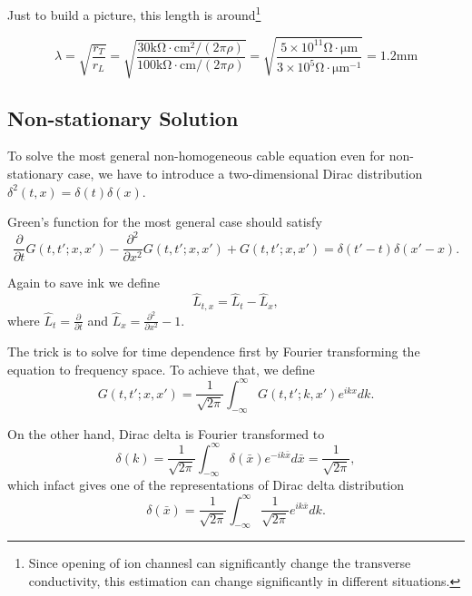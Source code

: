 \documentclass{tufte-handout}
\begin{document}
Just to build a picture, this length is around\footnote{Since opening of ion channesl can significantly change the transverse conductivity, this estimation can change significantly in different situations.}

\begin{equation*}
    \lambda = \sqrt{ \frac{r_T}{r_L}} = \sqrt{ \frac{30\mathrm{k\Omega\cdot cm^2}/(2\pi \rho)}{ 100 \mathrm{k\Omega\cdot cm}/(2\pi \rho) } } = \sqrt{ \frac{5\times 10^{11} \mathrm{\Omega \cdot \mu m} }{ 3\times 10^{5} \mathrm{\Omega \cdot \mu m^{-1}}  } } = 1.2\mathrm{mm}
\end{equation*}





\subsection{Non-stationary Solution}

To solve the most general non-homogeneous cable equation even for non-stationary case, we have to introduce a two-dimensional Dirac distribution $\delta^2(t,x) = \delta(t)\delta(x)$.

Green's function for the most general case should satisfy\cite{Gerstner2002}
\begin{equation}
    \frac{\partial}{\partial t} G(t,t';x,x') - \frac{\partial^2}{\partial x^2}  G(t,t';x,x') +  G(t,t';x,x') = \delta(t'-t)\delta(x'-x).
\end{equation}

Again to save ink we define
\begin{equation*}
    \hat L_{t,x} = \hat L_t - \hat L_x,
\end{equation*}
where $\hat L_t = \frac{\partial}{\partial t}$ and $\hat L_x = \frac{\partial^2}{\partial x^2} - 1$.

The trick is to solve for time dependence first by Fourier transforming the equation to frequency space. To achieve that, we define
\begin{equation}
    G(t,t';x,x') = \frac{1}{\sqrt{2\pi}}\int_{-\infty}^\infty G(t,t';k,x')e^{ikx}dk.\label{eqn-green-function-fourier-transform}
\end{equation}

On the other hand, Dirac delta is Fourier transformed to
\begin{equation}
\delta(k) = \frac{1}{\sqrt{2\pi}} \int_{-\infty}^\infty \delta(\bar x) e^{- ik \bar x} d\bar x = \frac{1}{\sqrt{2\pi}} ,
    \label{eqn-dirac-delta-fourier-transform}
\end{equation}
which infact gives one of the representations of Dirac delta distribution
\begin{equation}
    \delta(\bar x) = \frac{1}{\sqrt{2\pi}}\int_{-\infty}^\infty \frac{1}{\sqrt{2\pi}} e^{ik \bar x} dk .
\end{equation}
\end{document}
